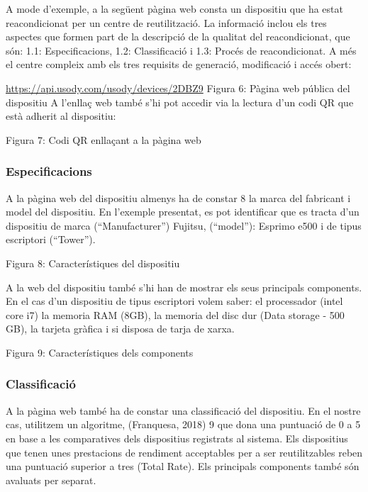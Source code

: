 \documentclass[
]{book}
\begin{document}
A mode d'exemple, a la següent pàgina web consta un dispositiu que ha estat reacondicionat per un centre de reutilització. La informació inclou els tres aspectes que formen part de la descripció de la qualitat del reacondicionat, que són: 1.1: Especificacions, 1.2: Classificació i 1.3: Procés de reacondicionat. A més el centre compleix amb els tres requisits de generació, modificació i accés obert:

\url{https://api.usody.com/usody/devices/2DBZ9} Figura 6: Pàgina web pública del dispositiu A l'enllaç web també s'hi pot accedir via la lectura d'un codi QR que està adherit al dispositiu:

Figura 7: Codi QR enllaçant a la pàgina web

\hypertarget{especificacions}{%
\subsubsection{Especificacions}\label{especificacions}}

A la pàgina web del dispositiu almenys ha de constar 8 la marca del fabricant i model del dispositiu. En l'exemple presentat, es pot identificar que es tracta d'un dispositiu de marca (``Manufacturer'') Fujitsu, (``model''): Esprimo e500 i de tipus escriptori (``Tower'').

Figura 8: Característiques del dispositiu

A la web del dispositiu també s'hi han de mostrar els seus principals components. En el cas d'un dispositiu de tipus escriptori volem saber: el processador (intel core i7) la memoria RAM (8GB), la memoria del disc dur (Data storage - 500 GB), la tarjeta gràfica i si disposa de tarja de xarxa.

Figura 9: Característiques dels components

\hypertarget{classificaciuxf3}{%
\subsubsection{Classificació}\label{classificaciuxf3}}

A la pàgina web també ha de constar una classificació del dispositiu. En el nostre cas, utilitzem un algoritme, (Franquesa, 2018) 9 que dona una puntuació de 0 a 5 en base a les comparatives dels dispositius registrats al sistema. Els dispositius que tenen unes prestacions de rendiment acceptables per a ser reutilitzables reben una puntuació superior a tres (Total Rate). Els principals components també són avaluats per separat.
\end{document}
